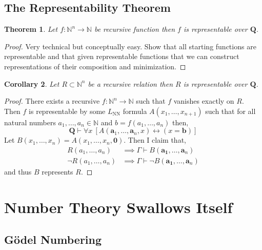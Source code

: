 \documentclass[12pt, leqno]{article}
\newcommand{\N}{\mathbb{N}}
\renewcommand{\bf}[1]{\mathbf{#1}}
\newcommand{\proves}{\vdash}
\newcommand{\uq}[1]{\forall{#1} \:}
\theoremstyle{theorem}
\newtheorem{theorem}{Theorem}[section]
\newtheorem{corollary}[theorem]{Corollary}
\theoremstyle{definition}
\theoremstyle{definition}
\theoremstyle{remark}
\theoremstyle{definition}
\theoremstyle{remark}
\begin{document}
\subsection{The Representability Theorem}

\begin{theorem}
Let $f : \N^n \to \N$ be recursive function then $f$ is representable over $\bf{Q}$. 
\end{theorem}

\begin{proof}
Very technical but conceptually easy. Show that all starting functions are representable and that given representable functions that we can construct representations of their composition and minimization. 
\end{proof}

\begin{corollary}
Let $R \subset \N^n$ be a recursive relation then $R$ is representable over $\bf{Q}$.
\end{corollary}

\begin{proof}
There exists a recursive $f : \N^n \to \N$ such that $f$ vanishes exactly on $R$. Then $f$ is representable by some $L_{\text{NN}}$ formula $A(x_1, \dots, x_{n+1})$ such that for all natural numbers $a_1, \dots, a_n \in \N$ and $b = f(a_1, \dots, a_n)$ then,
\[ \bf{Q} \proves \uq{x} [ A(\bf{a}_1, \dots, \bf{a}_n, x) \leftrightarrow (x = \bf{b}) ] \] 
Let $B(x_1, \dots, x_n) = A(x_1, \dots, x_n, \bf{0})$. Then I claim that,
\begin{align*}
R(a_1, \dots, a_n) & \implies \Gamma \proves B(\bf{a_1}, \dots, \bf{a}_n)
\\
\neg R(a_1, \dots, a_n) & \implies \Gamma \proves \neg B(\bf{a_1}, \dots, \bf{a}_n)
\end{align*}
and thus $B$ represents $R$. 
\end{proof}

\section{Number Theory Swallows Itself}

\newcommand{\Gnum}[1]{\#_g\left( #1 \right)}
\newcommand{\Gterm}[1]{\left\ulcorner #1 \right\urcorner}


\subsection{G\"{o}del Numbering}
\end{document}
